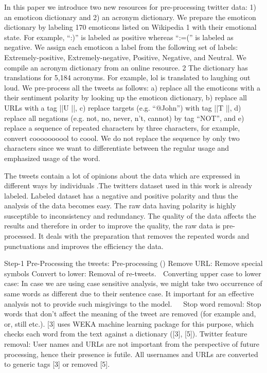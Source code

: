 \documentclass{acmtog} %
\begin{document}
In this paper we introduce two new resources for pre-processing twitter data: 1) an emoticon dictionary and 2) an acronym dictionary. We prepare the emoticon dictionary by labeling 170 emoticons listed on Wikipedia 1 with their emotional state. For example, “:)” is labeled as positive whereas “:=(” is labeled as negative. We assign each emoticon a label from the following set of labels: Extremely-positive, Extremely-negative, Positive, Negative, and Neutral. We compile an acronym dictionary from an online resource. 2 The dictionary has translations for 5,184 acronyms. For example, lol is translated to laughing out loud. We pre-process all the tweets as follows: a) replace all the emoticons with a their sentiment polarity by looking up the emoticon dictionary, b) replace all URLs with a tag ||U ||, c) replace targets (e.g. “@John”) with tag ||T ||, d) replace all negations (e.g. not, no, never, n’t, cannot) by tag “NOT”, and e) replace a sequence of repeated characters by three characters, for example, convert coooooooool to coool. We do not replace the sequence by only two characters since we want to differentiate between the regular usage and emphasized usage of the word.

The tweets contain a lot of opinions about the data which are expressed in different ways by individuals .The twitters dataset used in this work is already labeled. Labeled dataset has a negative and positive polarity and thus the analysis of the data becomes easy. The raw data having polarity is highly susceptible to inconsistency and redundancy. The quality of the data affects the results and therefore in order to improve the quality, the raw data is pre-processed. It deals with the preparation that removes the repeated words and punctuations and improves the efficiency the data.

Step-1 Pre-Processing the tweets:
Pre-processing ()
Remove URL:
Remove special symbols
Convert to lower:
Removal of re-tweets.
 Converting upper case to lower case: In case we are
using case sensitive analysis, we might take two
occurrence of same words as different due to their
sentence case. It important for an effective analysis not
to provide such misgivings to the model.


Stop word removal: Stop words that don’t affect the
meaning of the tweet are removed (for example and,
or, still etc.). [3] uses WEKA machine learning
package for this purpose, which checks each word
from the text against a dictionary ([3], [5]).
Twitter feature removal: User names and URLs are
not important from the perspective of future
processing, hence their presence is futile. All
usernames and URLs are converted to generic tags [3]
or removed [5].
\end{document}
